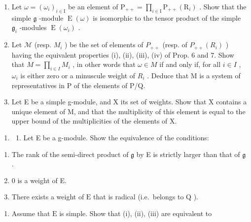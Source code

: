 \begin{enumerate}
\def\labelenumi{\alph{enumi})}
\item
  Let \(\omega = (\omega_{i})_{i\in \mathrm{I}}\) be an element of \(\mathrm{P}_{++} = \prod_{i\in \mathrm{I}}\mathrm{P}_{++}(\mathrm{R}_i)\) . Show that the simple \(\mathfrak{g}\) -module \(\operatorname {E}(\omega)\) is isomorphic to the tensor product of the simple \(\mathfrak{g}_i\) -modules \(\operatorname {E}(\omega_i)\) .
\item
  Let \(\mathcal{M}\) (resp. \(M_{i}\) ) be the set of elements of \(P_{++}\) (resp. of \(P_{++}(R_{i})\) ) having the equivalent properties (i), (ii), (iii), (iv) of Prop. 6 and 7. Show that \(M = \prod_{i \in I} M_{i}\) , in other words that \(\omega \in M\) if and only if, for all \(i \in I\) , \(\omega_{i}\) is either zero or a minuscule weight of \(R_{i}\) . Deduce that M is a system of representatives in P of the elements of P/Q.
\item
  Let E be a simple g-module, and X its set of weights. Show that X contains a unique element of M, and that the multiplicity of this element is equal to the upper bound of the multiplicities of the elements of X.
\end{enumerate}

\begin{enumerate}
\def\labelenumi{\arabic{enumi})}
\setcounter{enumi}{2}
\tightlist
\item
  \begin{enumerate}
  \def\labelenumii{\alph{enumii})}
  \tightlist
  \item
    Let E be a g-module. Show the equivalence of the conditions:
  \end{enumerate}
\end{enumerate}

\begin{enumerate}
\def\labelenumi{(\roman{enumi})}
\item
  The rank of the semi-direct product of \(\mathfrak{g}\) by E is strictly larger than that of \(\mathfrak{g}\) .
\item
  0 is a weight of E.
\item
  There exists a weight of \(\mathrm{E}\) that is radical (i.e.~belongs to \(\mathrm{Q}\) ).
\end{enumerate}

\begin{enumerate}
\def\labelenumi{\alph{enumi})}
\setcounter{enumi}{1}
\tightlist
\item
  Assume that \(\mathrm{E}\) is simple. Show that (i), (ii), (iii) are equivalent to
\end{enumerate}

